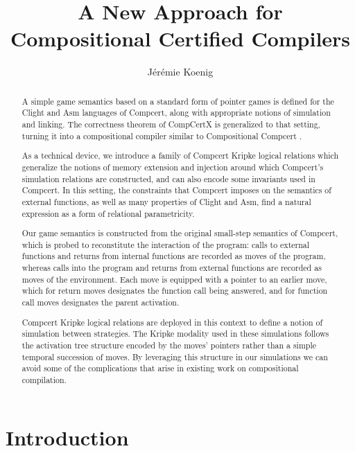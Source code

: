 \documentclass[acmsmall,anonymous]{acmart}
\begin{document}
\title{A New Approach for Compositional Certified Compilers}

\author{J\'er\'emie Koenig}

\begin{abstract} %
A simple game semantics based on a standard form of pointer games
is defined for the Clight and Asm languages of Compcert,
along with appropriate notions of simulation and linking.
The correctness theorem of CompCertX \citep{popl15}
is generalized to that setting,
turning it into a compositional compiler
similar to Compositional Compcert \citep{compcomp}.

As a technical device,
we introduce a family of Compcert Kripke logical relations
which generalize the notions of memory extension and injection
around which Compcert's simulation relations are constructed,
and can also encode some invariants used in Compcert.
In this setting,
the constraints that Compcert imposes on the semantics of external functions,
as well as many properties of Clight and Asm,
find a natural expression as a form of relational parametricity.

Our game semantics is constructed from the original
small-step semantics of Compcert,
which is probed to reconstitute the interaction of the program:
calls to external functions and returns from internal functions
are recorded as moves of the program,
whereas calls into the program and returns from external functions
are recorded as moves of the environment.
Each move is equipped with a pointer to an earlier move,
which for return moves designates the function call being answered,
and for function call moves designates the parent activation.

Compcert Kripke logical relations are deployed in this context
to define a notion of simulation between strategies.
The Kripke modality used in these simulations
follows the activation tree structure
encoded by the moves' pointers
rather than a simple temporal succession of moves.
By leveraging this structure in our simulations
we can avoid some of the complications
that arise in existing work on compositional compilation.
\end{abstract}

\maketitle

\section{Introduction} %
\end{document}
